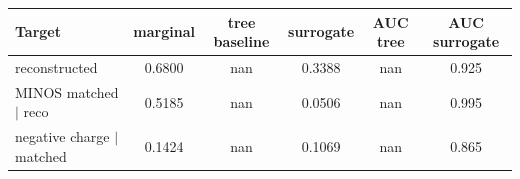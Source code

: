 \begin{tabular}{lccccc}
\toprule
Target & marginal & tree baseline & surrogate & AUC tree & AUC surrogate \\
\midrule
reconstructed & 0.6800 & nan & 0.3388 & nan & 0.925 \\
MINOS matched $\mid$ reco & 0.5185 & nan & 0.0506 & nan & 0.995 \\
negative charge $\mid$ matched & 0.1424 & nan & 0.1069 & nan & 0.865 \\
\bottomrule
\end{tabular}
